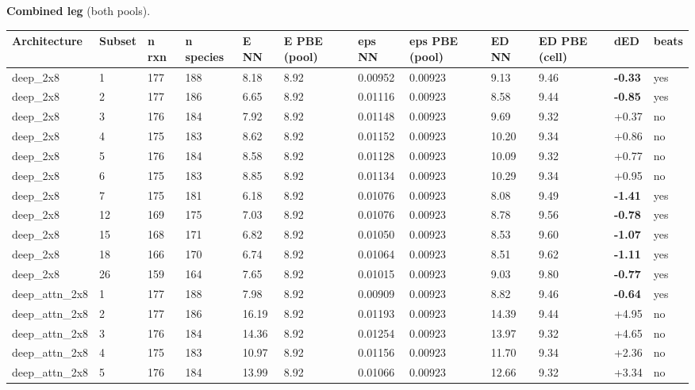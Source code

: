 \documentclass[10pt,a4paper]{article}
\begin{document}
\begin{landscape}
\textbf{Combined leg} (both pools).

\begin{scriptsize}
\begin{longtable}{llllllllllll}
\toprule Architecture & Subset & n rxn & n species & E NN & E PBE (pool) & eps NN & eps PBE (pool) & ED NN & ED PBE (cell) & dED & beats \\ \midrule \endhead
deep\_2x8 & 1 & 177 & 188 & 8.18 & 8.92 & 0.00952 & 0.00923 & 9.13 & 9.46 & \textbf{-0.33} & yes \\
deep\_2x8 & 2 & 177 & 186 & 6.65 & 8.92 & 0.01116 & 0.00923 & 8.58 & 9.44 & \textbf{-0.85} & yes \\
deep\_2x8 & 3 & 176 & 184 & 7.92 & 8.92 & 0.01148 & 0.00923 & 9.69 & 9.32 & +0.37 & no \\
deep\_2x8 & 4 & 175 & 183 & 8.62 & 8.92 & 0.01152 & 0.00923 & 10.20 & 9.34 & +0.86 & no \\
deep\_2x8 & 5 & 176 & 184 & 8.58 & 8.92 & 0.01128 & 0.00923 & 10.09 & 9.32 & +0.77 & no \\
deep\_2x8 & 6 & 175 & 183 & 8.85 & 8.92 & 0.01134 & 0.00923 & 10.29 & 9.34 & +0.95 & no \\
deep\_2x8 & 7 & 175 & 181 & 6.18 & 8.92 & 0.01076 & 0.00923 & 8.08 & 9.49 & \textbf{-1.41} & yes \\
deep\_2x8 & 12 & 169 & 175 & 7.03 & 8.92 & 0.01076 & 0.00923 & 8.78 & 9.56 & \textbf{-0.78} & yes \\
deep\_2x8 & 15 & 168 & 171 & 6.82 & 8.92 & 0.01050 & 0.00923 & 8.53 & 9.60 & \textbf{-1.07} & yes \\
deep\_2x8 & 18 & 166 & 170 & 6.74 & 8.92 & 0.01064 & 0.00923 & 8.51 & 9.62 & \textbf{-1.11} & yes \\
deep\_2x8 & 26 & 159 & 164 & 7.65 & 8.92 & 0.01015 & 0.00923 & 9.03 & 9.80 & \textbf{-0.77} & yes \\
deep\_attn\_2x8 & 1 & 177 & 188 & 7.98 & 8.92 & 0.00909 & 0.00923 & 8.82 & 9.46 & \textbf{-0.64} & yes \\
deep\_attn\_2x8 & 2 & 177 & 186 & 16.19 & 8.92 & 0.01193 & 0.00923 & 14.39 & 9.44 & +4.95 & no \\
deep\_attn\_2x8 & 3 & 176 & 184 & 14.36 & 8.92 & 0.01254 & 0.00923 & 13.97 & 9.32 & +4.65 & no \\
deep\_attn\_2x8 & 4 & 175 & 183 & 10.97 & 8.92 & 0.01156 & 0.00923 & 11.70 & 9.34 & +2.36 & no \\
deep\_attn\_2x8 & 5 & 176 & 184 & 13.99 & 8.92 & 0.01066 & 0.00923 & 12.66 & 9.32 & +3.34 & no \\

\end{longtable}
\end{scriptsize}
\end{landscape}
\end{document}
